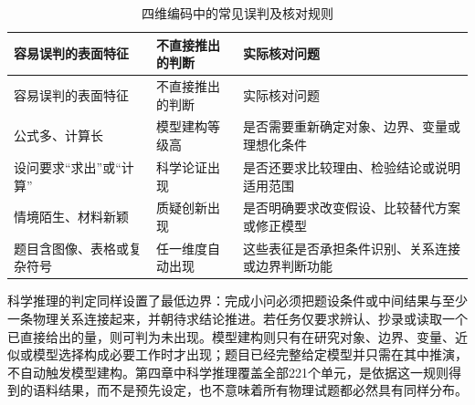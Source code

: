 \documentclass[
  12pt,
  a4paper,twoside,openany]{ctexbook}
\begin{document}
\begin{longtable}[]{@{}
  >{\raggedright\arraybackslash}p{}
  >{\raggedright\arraybackslash}p{}
  >{\raggedright\arraybackslash}p{}@{}}
\caption{四维编码中的常见误判及核对规则}\tabularnewline
\toprule\noalign{}
\rowcolor{ThesisPale}
\begin{minipage}[b]{\linewidth}\raggedright
容易误判的表面特征
\end{minipage} & \begin{minipage}[b]{\linewidth}\raggedright
不直接推出的判断
\end{minipage} & \begin{minipage}[b]{\linewidth}\raggedright
实际核对问题
\end{minipage} \\
\midrule\noalign{}
\endfirsthead
\toprule\noalign{}
\rowcolor{ThesisPale}
\begin{minipage}[b]{\linewidth}\raggedright
容易误判的表面特征
\end{minipage} & \begin{minipage}[b]{\linewidth}\raggedright
不直接推出的判断
\end{minipage} & \begin{minipage}[b]{\linewidth}\raggedright
实际核对问题
\end{minipage} \\
\midrule\noalign{}
\endhead
\bottomrule\noalign{}
\endlastfoot
公式多、计算长 & 模型建构等级高 &
是否需要重新确定对象、边界、变量或理想化条件 \\
设问要求``求出''或``计算'' & 科学论证出现 &
是否还要求比较理由、检验结论或说明适用范围 \\
情境陌生、材料新颖 & 质疑创新出现 &
是否明确要求改变假设、比较替代方案或修正模型 \\
题目含图像、表格或复杂符号 & 任一维度自动出现 &
这些表征是否承担条件识别、关系连接或边界判断功能 \\
\end{longtable}

科学推理的判定同样设置了最低边界：完成小问必须把题设条件或中间结果与至少一条物理关系连接起来，并朝待求结论推进。若任务仅要求辨认、抄录或读取一个已直接给出的量，则可判为未出现。模型建构则只有在研究对象、边界、变量、近似或模型选择构成必要工作时才出现；题目已经完整给定模型并只需在其中推演，不自动触发模型建构。第四章中科学推理覆盖全部221个单元，是依据这一规则得到的语料结果，而不是预先设定，也不意味着所有物理试题都必然具有同样分布。
\end{document}
